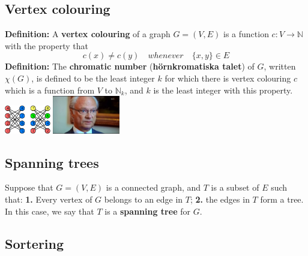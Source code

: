 \documentclass{article}
\begin{document}
\begin{multicols}{2}
\subsection{Vertex colouring}
\textbf{Definition:} A \textbf{vertex colouring} of a graph $G = (V,E)$ is a function $c: V \rightarrow \mathbb{N}$ with the property that $$c(x) \neq c(y) \quad whenever \quad \{x,y\} \in E$$
\newline
\textbf{Definition:} The \textbf{chromatic number} (\textbf{hörnkromatiska talet}) of $G$, written $\chi(G)$, is defined to be the least integer $k$ for which there is vertex colouring $c$ which is a function from $V$ to $\mathbb{N}_k$, and $k$ is the least integer with this property.\\

\includegraphics[width=0.15\textwidth]{greedy}
\includegraphics[width=0.22\textwidth]{knug} 

\subsection{Spanning trees}
Suppose that $G=(V,E)$ is a connected graph, and $T$ is a subset of $E$ such that: \textbf{1.} Every vertex of $G$ belongs to an edge in $T$; \textbf{2.} the edges in $T$ form a tree. In this case, we say that $T$ is a \textbf{spanning tree} for $G$.

\subsection{Sortering}

\end{multicols}
\end{document}
